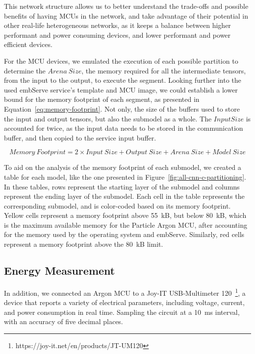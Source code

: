 This network structure allows us to better understand the 
trade-offs and possible benefits of having \acp{MCU} in the network, 
and take advantage of their potential in other real-life heterogeneous networks, as
it keeps a balance between higher performant and power consuming devices, and lower
performant and power efficient devices.

For the \ac{MCU} devices, we
emulated the execution of each possible partition to determine the $Arena\ Size$,
the memory required for all the intermediate tensors, from the input to the 
output, to execute the segment. Looking further into the used embServe service's 
template and \ac{MCU} image, we could establish a lower bound for the memory footprint
of each segment, as presented in Equation~\ref{eq:memory-footprint}. Not only, the
size of the buffers used to store the input and output tensors, but also the submodel 
as a whole. The $Input Size$ is accounted for twice, as the input data needs to
be stored in the communication buffer, and then copied to the service input buffer.

\begin{equation}
  Memory\ Footprint = 2 \times Input\ Size + Output\ Size + Arena\ Size + Model\ Size
  \label{eq:memory-footprint} 
\end{equation}

To aid on the analysis of the memory footprint of each submodel, we created a table
for each model, like the one presented in Figure~\ref{fig:all-cnn-c-partitioning}.
In these tables, rows represent the starting layer of the submodel and
columns represent the ending layer of the submodel. Each cell in the table represents
the corresponding submodel, and is color-coded based on its memory footprint.
Yellow cells represent a memory footprint
above 55~kB, but below 80~kB, which is the maximum available memory for the Particle
Argon \ac{MCU}, after accounting for the memory used by the operating system
and embServe. Similarly, red cells represent a memory footprint above the 80~kB limit.


\subsection {Energy Measurement} \label{sec:se512}

In addition, we connected an Argon \ac{MCU} to a Joy-IT USB-Multimeter 120~\footnote{https://joy-it.net/en/products/JT-UM120},
a device that reports a variety of electrical parameters, including voltage, current,
and power consumption in real time. Sampling the circuit at a 10~ms interval, with
an accuracy of five decimal places.


